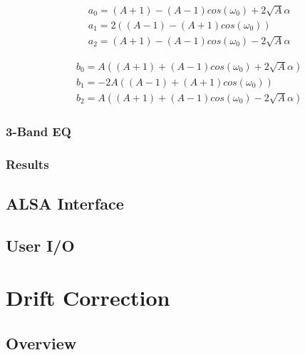 \documentclass[main.tex]{subfiles}
\begin{document}
\begin{center}
    \begin{minipage}{.5\linewidth}
        \begin{equation*}
            \begin{aligned} 
                &a_0 = (A + 1) - (A - 1)cos(\omega_ 0) + 2\sqrt{A} \alpha \\
                &a_1 = 2((A - 1) - (A + 1)cos(\omega_ 0)) \\
                &a_2 = (A + 1) - (A - 1)cos(\omega_ 0) - 2\sqrt{A} \alpha
            \end{aligned}
        \end{equation*}
        \end{minipage}%
        \begin{minipage}{.5\linewidth}
        \begin{equation*}
            \begin{aligned}
                &b_0 = A((A + 1) + (A - 1)cos(\omega _0) + 2\sqrt{A} \alpha) \\
                &b_1 = -2A((A - 1) + (A + 1)cos(\omega _0)) \\
                &b_2 = A((A + 1) + (A - 1)cos(\omega_ 0) - 2\sqrt{A} \alpha)
            \end{aligned}
        \end{equation*}
    \end{minipage}
    \end{center}

\medskip 


\subsubsection{3-Band EQ}
\subsubsection{Results}
\subsection{ALSA Interface}
\subsection{User I/O}

\section{Drift Correction}
\subsection{Overview}
\end{document}

